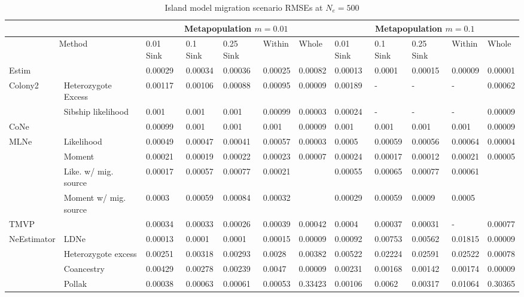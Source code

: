 \begin{landscape}
\begin{table}[h]
\centering \small
\caption[Island model migration scenario RMSEs at $N_e = 500$]{Island model migration scenario RMSEs at $N_e = 500$}
\label{tab:ne3}
\begin{tabular}{ | l | p{2cm}|| l | l | l | l | l || l | l | l | l | l | }
\hline
\multicolumn{2}{c}{ }   & \multicolumn{5}{c}{Metapopulation $m = 0.01$}  & \multicolumn{5}{c}{Metapopulation $m = 0.1$}  \\ \hline
\multicolumn{2}{c}{Method} & 0.01 Sink & 0.1 Sink & 0.25 Sink & Within & Whole & 0.01 Sink & 0.1 Sink & 0.25 Sink & Within & Whole \\ \hline
Estim & & 0.00029 & 0.00034 & 0.00036 & 0.00025 & 0.00082 & 0.00013 & 0.0001 & 0.00015 & 0.00009 & 0.00001 \\ \hline
Colony2 & Heterozygote Excess & 0.00117 & 0.00106 & 0.00088 & 0.00095 & 0.00009 & 0.00189 & - & - & - & 0.00062 \\ \hline
 & Sibship likelihood & 0.001 & 0.001 & 0.001 & 0.00099 & 0.00003 & 0.00024 & - & - & - & 0.00009 \\ \hline
CoNe &  & 0.00099 & 0.001 & 0.001 & 0.001 & 0.00009 & 0.001 & 0.001 & 0.001 & 0.001 & 0.00009 \\ \hline
MLNe  & Likelihood & 0.00049 & 0.00047 & 0.00041 & 0.00057 & 0.00003 & 0.0005 & 0.00059 & 0.00056 & 0.00064 & 0.00004 \\ \hline
 & Moment  & 0.00021 & 0.00019 & 0.00022 & 0.00023 & 0.00007 & 0.00024 & 0.00017 & 0.00012 & 0.00021 & 0.00005 \\ \hline
 & Like. w/ mig. source & 0.00017 & 0.00057 & 0.00077 & 0.00021 &  & 0.00055 & 0.00065 & 0.00077 & 0.00061 &  \\ \hline
 & Moment w/ mig. source & 0.0003 & 0.00059 & 0.00084 & 0.00032 &  & 0.00029 & 0.00059 & 0.0009 & 0.0005 &  \\ \hline
TMVP &  & 0.00034 & 0.00033 & 0.00026 & 0.00039 & 0.00042 & 0.0004 & 0.00037 & 0.00031 & - & 0.00077 \\ \hline
NeEstimator & LDNe & 0.00013 & 0.0001 & 0.0001 & 0.00015 & 0.00009 & 0.00092 & 0.00753 & 0.00562 & 0.01815 & 0.00009 \\ \hline
 & Heterozygote excess & 0.00251 & 0.00318 & 0.00293 & 0.0028 & 0.00382 & 0.00522 & 0.02224 & 0.02591 & 0.02522 & 0.00078 \\ \hline
 & Coancestry & 0.00429 & 0.00278 & 0.00239 & 0.0047 & 0.00009 & 0.00231 & 0.00168 & 0.00142 & 0.00174 & 0.00009 \\ \hline
 & Pollak & 0.00038 & 0.00063 & 0.00061 & 0.00053 & 0.33423 & 0.00106 & 0.0062 & 0.00317 & 0.01064 & 0.30365 \\ \hline

\end{tabular}
\end{table}
\end{landscape}
